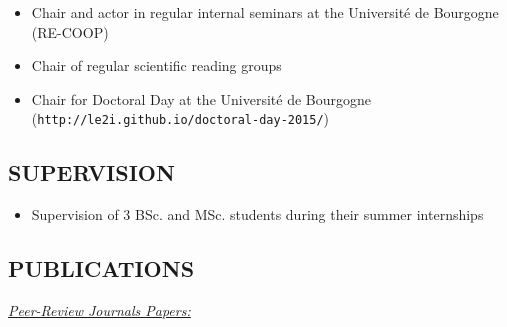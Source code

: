 {\begin{itemize}
\item Chair and actor in regular internal seminars at the Universit\'e de Bourgogne (RE-COOP)
\item Chair of regular scientific reading groups
\item Chair for Doctoral Day at the Universit\'e de Bourgogne (\texttt{http://le2i.github.io/doctoral-day-2015/})
\end{itemize}

\subsection{SUPERVISION}

\begin{itemize}
\item Supervision of 3 BSc. and MSc. students during their summer internships
\end{itemize}

\subsection{PUBLICATIONS}

\underline{\textit{Peer-Review Journals Papers:}}

\begin{enumerate}


\end{enumerate}}
